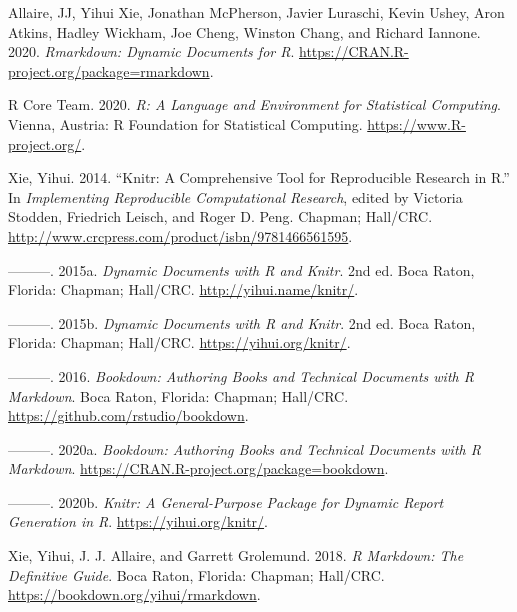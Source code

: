 \documentclass[
  lang=cn,
  11pt,
  scheme=chinese,
  chinesefont=nofont,
  bibstyle=apalike]{elegantbook}
\newlength{\cslhangindent}
\newenvironment{cslreferences}%
  {\setlength{\parindent}{0pt}%
  \everypar{\setlength{\hangindent}{\cslhangindent}}\ignorespaces}%
  {\par}
\begin{document}
\hypertarget{refs}{}
\begin{cslreferences}
\leavevmode\hypertarget{ref-R-rmarkdown}{}%
Allaire, JJ, Yihui Xie, Jonathan McPherson, Javier Luraschi, Kevin Ushey, Aron Atkins, Hadley Wickham, Joe Cheng, Winston Chang, and Richard Iannone. 2020. \emph{Rmarkdown: Dynamic Documents for R}. \url{https://CRAN.R-project.org/package=rmarkdown}.

\leavevmode\hypertarget{ref-R-base}{}%
R Core Team. 2020. \emph{R: A Language and Environment for Statistical Computing}. Vienna, Austria: R Foundation for Statistical Computing. \url{https://www.R-project.org/}.

\leavevmode\hypertarget{ref-knitr2014}{}%
Xie, Yihui. 2014. ``Knitr: A Comprehensive Tool for Reproducible Research in R.'' In \emph{Implementing Reproducible Computational Research}, edited by Victoria Stodden, Friedrich Leisch, and Roger D. Peng. Chapman; Hall/CRC. \url{http://www.crcpress.com/product/isbn/9781466561595}.

\leavevmode\hypertarget{ref-xie2015}{}%
---------. 2015a. \emph{Dynamic Documents with R and Knitr}. 2nd ed. Boca Raton, Florida: Chapman; Hall/CRC. \url{http://yihui.name/knitr/}.

\leavevmode\hypertarget{ref-knitr2015}{}%
---------. 2015b. \emph{Dynamic Documents with R and Knitr}. 2nd ed. Boca Raton, Florida: Chapman; Hall/CRC. \url{https://yihui.org/knitr/}.

\leavevmode\hypertarget{ref-bookdown2016}{}%
---------. 2016. \emph{Bookdown: Authoring Books and Technical Documents with R Markdown}. Boca Raton, Florida: Chapman; Hall/CRC. \url{https://github.com/rstudio/bookdown}.

\leavevmode\hypertarget{ref-R-bookdown}{}%
---------. 2020a. \emph{Bookdown: Authoring Books and Technical Documents with R Markdown}. \url{https://CRAN.R-project.org/package=bookdown}.

\leavevmode\hypertarget{ref-R-knitr}{}%
---------. 2020b. \emph{Knitr: A General-Purpose Package for Dynamic Report Generation in R}. \url{https://yihui.org/knitr/}.

\leavevmode\hypertarget{ref-rmarkdown2018}{}%
Xie, Yihui, J. J. Allaire, and Garrett Grolemund. 2018. \emph{R Markdown: The Definitive Guide}. Boca Raton, Florida: Chapman; Hall/CRC. \url{https://bookdown.org/yihui/rmarkdown}.
\end{cslreferences}
\end{document}
